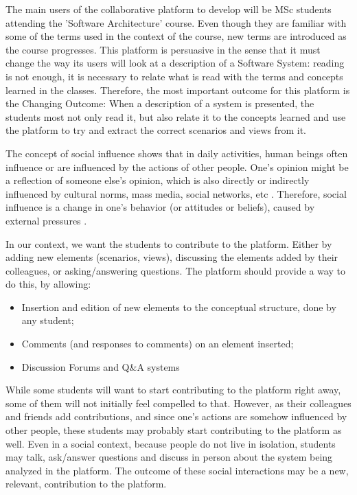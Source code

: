 The main users of the collaborative platform to develop will be MSc students attending the 'Software  Architecture' course. Even though they are familiar with some of the terms used in the context of the course, new terms are introduced as the course progresses. This platform is persuasive in the sense that it must change the way its users will look at a description of a Software System: reading is not enough, it is necessary to relate what is read with the terms and concepts learned in the classes.
Therefore, the most important outcome for this platform is the Changing Outcome: When a description of a system is presented, the students most not only read it, but also relate it to the concepts learned and use the platform to try and extract the correct scenarios and views from it.

The concept of social influence shows that in daily activities, human beings often influence or are influenced by the actions of other people. One's opinion might be a reflection of someone else's opinion, which is also directly or indirectly influenced by cultural norms, mass media, social networks, etc \cite{mavrodiev2013quantifying}. Therefore, social influence is a change in one's behavior (or attitudes or beliefs), caused by external pressures \cite{guadagno2010preference}. 

In our context, we want the students to contribute to the platform. Either by adding new elements (scenarios, views), discussing the elements added by their colleagues, or asking/answering questions. 
The platform should provide a way to do this, by allowing: 
\begin{itemize}
\item Insertion and edition of new elements to the conceptual structure, done by any student;
\item Comments (and responses to comments) on an element inserted;
\item Discussion Forums and Q\&A systems
\end{itemize}


While some students will want to start contributing to the platform right away, some of them will not initially feel compelled to that. However, as their colleagues and friends add contributions, and since one's actions are somehow influenced by other people, these students may probably start contributing to the platform as well. Even in a social context, because people do not live in isolation, students may talk, ask/answer questions and discuss in person about the system being analyzed in the platform. The outcome of these social interactions may be a new, relevant, contribution to the platform.

